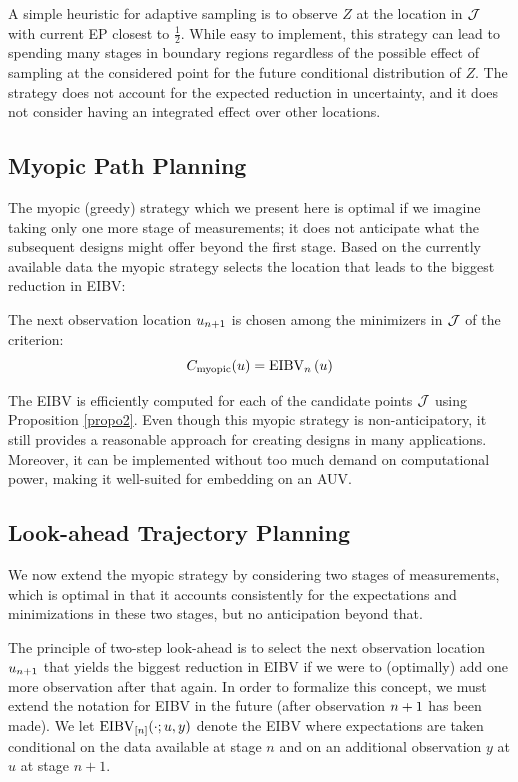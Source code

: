 \documentclass[aoas]{imsart}
\begin{document}
A simple heuristic for adaptive sampling is to observe $Z$ at the
location in $\mathcal{J}$ with current EP closest to
$\frac{1}{2}$. While easy to implement, this strategy can lead to
spending many stages in boundary regions regardless of the possible
effect of sampling at the considered point for the future conditional
distribution of $Z$. The strategy does not account for the expected
reduction in uncertainty, and it does not consider having an
integrated effect over other locations.


\subsection{Myopic Path Planning}
\label{sec:myopic}

The myopic (greedy) strategy which we present here is optimal if we
imagine taking only one more stage of measurements; it does not
anticipate what the subsequent designs might offer beyond the first
stage.  Based on the currently available data the myopic strategy
selects the location that leads to the biggest reduction in EIBV:
\begin{criterion}[Myopic]
The next observation location $u_{n + 1}$ is chosen among
the minimizers in $\mathcal{J}$ of the criterion: 
\begin{equation}\label{critSEQ}
     C_{\text{myopic}}(u) = \EIBV_{\stage}\left(\spatloc\right)
\end{equation}
\end{criterion}

The EIBV is efficiently computed for each of the candidate points
$\mathcal{J}$ using Proposition \ref{propo2}. 
Even though this myopic strategy is non-anticipatory, it still
provides a reasonable approach for creating designs in many
applications. Moreover, it can be implemented without too much demand on
computational power, making it well-suited for embedding on an AUV.


\subsection{Look-ahead Trajectory Planning}
\label{sec:LA}

We now extend the myopic strategy by considering two stages of
measurements, which is optimal in that it accounts consistently for
the expectations and minimizations in these two stages, but no anticipation beyond that.

The principle of
two-step look-ahead is to select the next observation location $u_{n + 1}$ that yields the biggest reduction in EIBV if
we were to (optimally) add one more observation after that again. In order to formalize this concept, we must
extend the notation for EIBV in the future (after observation
$n + 1$ has been made). We let $\operatorname{EIBV}_{[n]}(\cdot; u, y)$
denote the EIBV where expectations are taken conditional on the data
available at stage $n$ and on an additional observation $y$ at $u$ at stage $n+1$.
\end{document}
